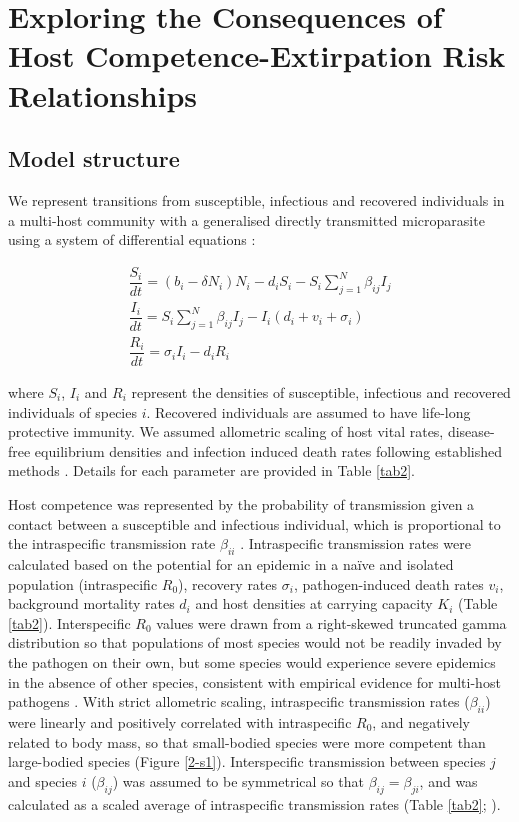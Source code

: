 \section{Exploring the Consequences of Host Competence-Extirpation Risk Relationships}

\subsection{Model structure}

We represent transitions from susceptible, infectious and recovered individuals in a multi-host community with a generalised directly transmitted microparasite using a system of differential equations \citep{Dobson2004}:

\begin{eqnarray}
  \dfrac{S_i}{dt} = (b_i - \delta N_i)N_i - d_i S_i - S_i \sum_{j=1}^{N} \beta_{ij} I_j \\
  \dfrac{I_i}{dt} = S_i \sum_{j=1}^{N} \beta_{ij} I_j - I_i (d_i + v_i + \sigma_i) \\
  \dfrac{R_i}{dt} = \sigma_i I_i - d_i R_i \label{eq:sir}
\end{eqnarray}

where $S_i$, $I_i$ and $R_i$ represent the densities of susceptible, infectious and recovered individuals of species $i$.
Recovered individuals are assumed to have life-long protective immunity.
We assumed allometric scaling of host vital rates, disease-free equilibrium densities and infection induced death rates following established methods \citep{Leo1996, Dobson2004, Bolzoni2008a}.
Details for each parameter are provided in Table \ref{tab2}.

Host competence was represented by the probability of transmission given a contact between a susceptible and infectious individual, which is proportional to the intraspecific transmission rate $\beta_{ii}$ \citep{Keesing2006}.
Intraspecific transmission rates were calculated based on the potential for an epidemic in a naïve and isolated population (intraspecific $R_0$), recovery rates $\sigma_i$, pathogen-induced death rates $v_i$, background mortality rates $d_i$ and host densities at carrying capacity $K_i$ (Table \ref{tab2}).
Interspecific $R_0$ values were drawn from a right-skewed truncated gamma distribution so that populations of most species would not be readily invaded by the pathogen on their own, but some species would experience severe epidemics in the absence of other species, consistent with empirical evidence for multi-host pathogens \citep{Komar2003, Ostfeld2003, Huang2013, Johnson2013}.
With strict allometric scaling, intraspecific transmission rates ($\beta_{ii}$) were linearly and positively correlated with intraspecific $R_0$, and negatively related to body mass, so that small-bodied species were more competent than large-bodied species (Figure \ref{2-s1}).
Interspecific transmission between species $j$ and species $i$ ($\beta_{ij}$) was assumed to be symmetrical so that $\beta_{ij} = \beta_{ji}$, and was calculated as a scaled average of intraspecific transmission rates (Table \ref{tab2}; \cite{Dobson2004}).

